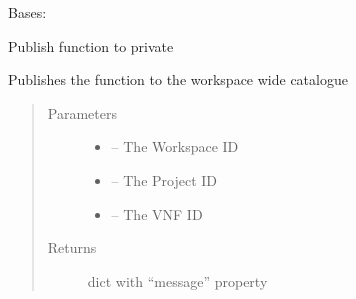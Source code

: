 \documentclass[letterpaper,10pt,english]{sphinxmanual}
\begin{document}
\begin{fulllineitems}
\label{_source/son_editor.apis:son_editor.apis.project_functionsapi.PrivateFunction}
Bases: 

\begin{fulllineitems}
\label{_source/son_editor.apis:son_editor.apis.project_functionsapi.PrivateFunction.get}
Publish function to private

Publishes the function to the workspace wide catalogue
\begin{quote}\begin{description}
\item[{Parameters}] \leavevmode\begin{itemize}
\item {} 
 -- The Workspace ID

\item {} 
 -- The Project ID

\item {} 
 -- The VNF ID

\end{itemize}

\item[{Returns}] \leavevmode
dict with ``message'' property

\end{description}\end{quote}

\end{fulllineitems}


\begin{fulllineitems}
\label{_source/son_editor.apis:son_editor.apis.project_functionsapi.PrivateFunction.methods}
\end{fulllineitems}


\end{fulllineitems}
\end{document}
